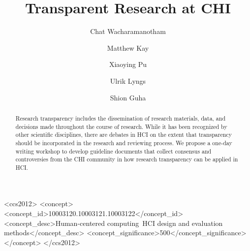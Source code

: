 \documentclass[sigchi-a, authorversion]{acmart}
\begin{document}
\title{Transparent Research at CHI}

\author{Chat Wacharamanotham}

\author{Matthew Kay}

\author{Xiaoying Pu}

\author{Ulrik Lyngs}

\author{Shion Guha}


\renewcommand{\shortauthors}{F. Author et al.}


%
%
\begin{CCSXML}
<ccs2012>
<concept>
<concept_id>10003120.10003121.10003122</concept_id>
<concept_desc>Human-centered computing~HCI design and evaluation methods</concept_desc>
<concept_significance>500</concept_significance>
</concept>
</ccs2012>
\end{CCSXML}



\begin{abstract}
Research transparency includes the dissemination of research materials, data, and decisions made throughout the course of research. While it has been recognized by other scientific disciplines, there are debates in HCI on the extent that transparency should be incorporated in the research and reviewing process. We propose a one-day writing workshop to develop guideline documents that collect consensus and controversies from the CHI community in how research transparency can be applied in HCI.
\end{abstract}





\maketitle
\end{document}
